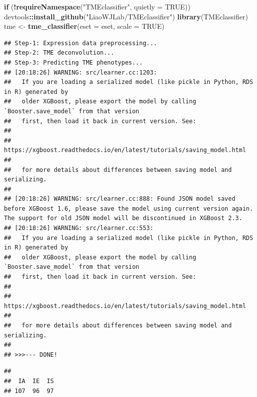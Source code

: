 \documentclass[
  12pt,
]{book}
\newenvironment{Shaded}{\begin{snugshade}}{\end{snugshade}}
\newcommand{\AttributeTok}[1]{\textcolor[rgb]{0.13,0.29,0.53}{#1}}
\newcommand{\ConstantTok}[1]{\textcolor[rgb]{0.56,0.35,0.01}{#1}}
\newcommand{\ControlFlowTok}[1]{\textcolor[rgb]{0.13,0.29,0.53}{\textbf{#1}}}
\newcommand{\FunctionTok}[1]{\textcolor[rgb]{0.13,0.29,0.53}{\textbf{#1}}}
\newcommand{\NormalTok}[1]{#1}
\newcommand{\OtherTok}[1]{\textcolor[rgb]{0.56,0.35,0.01}{#1}}
\newcommand{\SpecialCharTok}[1]{\textcolor[rgb]{0.81,0.36,0.00}{\textbf{#1}}}
\newcommand{\StringTok}[1]{\textcolor[rgb]{0.31,0.60,0.02}{#1}}
\begin{document}
\begin{Shaded}
\begin{Highlighting}[]
\ControlFlowTok{if}\NormalTok{ (}\SpecialCharTok{!}\FunctionTok{requireNamespace}\NormalTok{(}\StringTok{"TMEclassifier"}\NormalTok{, }\AttributeTok{quietly =} \ConstantTok{TRUE}\NormalTok{)) devtools}\SpecialCharTok{::}\FunctionTok{install\_github}\NormalTok{(}\StringTok{"LiaoWJLab/TMEclassifier"}\NormalTok{)}
\FunctionTok{library}\NormalTok{(TMEclassifier)}
\NormalTok{tme }\OtherTok{\textless{}{-}} \FunctionTok{tme\_classifier}\NormalTok{(}\AttributeTok{eset =}\NormalTok{ eset, }\AttributeTok{scale =} \ConstantTok{TRUE}\NormalTok{)}
\end{Highlighting}
\end{Shaded}

\begin{verbatim}
## Step-1: Expression data preprocessing...
## Step-2: TME deconvolution...
## Step-3: Predicting TME phenotypes...
## [20:18:26] WARNING: src/learner.cc:1203: 
##   If you are loading a serialized model (like pickle in Python, RDS in R) generated by
##   older XGBoost, please export the model by calling `Booster.save_model` from that version
##   first, then load it back in current version. See:
## 
##     https://xgboost.readthedocs.io/en/latest/tutorials/saving_model.html
## 
##   for more details about differences between saving model and serializing.
## 
## [20:18:26] WARNING: src/learner.cc:888: Found JSON model saved before XGBoost 1.6, please save the model using current version again. The support for old JSON model will be discontinued in XGBoost 2.3.
## [20:18:26] WARNING: src/learner.cc:553: 
##   If you are loading a serialized model (like pickle in Python, RDS in R) generated by
##   older XGBoost, please export the model by calling `Booster.save_model` from that version
##   first, then load it back in current version. See:
## 
##     https://xgboost.readthedocs.io/en/latest/tutorials/saving_model.html
## 
##   for more details about differences between saving model and serializing.
## 
## >>>--- DONE!
\end{verbatim}

\begin{Shaded}
\end{Shaded}

\begin{verbatim}
## 
##  IA  IE  IS 
## 107  96  97
\end{verbatim}
\end{document}
